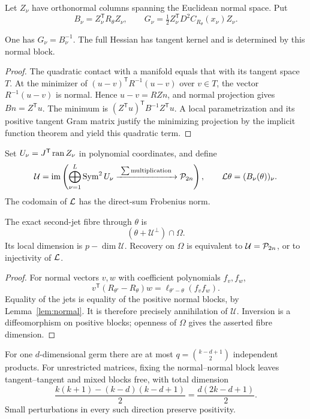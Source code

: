 Let $Z_\nu$ have orthonormal columns spanning the Euclidean normal space. Put
\[
 B_\nu=Z_\nu^{\mathsf T}R_\theta Z_\nu,\qquad
 G_\nu=\tfrac12Z_\nu^{\mathsf T}D^2C_{R_\theta}(x_\nu)Z_\nu.
\]
\begin{lemma}\label{lem:normal}
One has $G_\nu=B_\nu^{-1}$. The full Hessian has tangent kernel and is determined by this normal block.
\end{lemma}
\begin{proof}
The quadratic contact with a manifold equals that with its tangent space $T$. At the minimizer of $(u-v)^{\mathsf T}R^{-1}(u-v)$ over $v\in T$, the vector $R^{-1}(u-v)$ is normal. Hence $u-v=RZn$, and normal projection gives $Bn=Z^{\mathsf T}u$. The minimum is $(Z^{\mathsf T}u)^{\mathsf T}B^{-1}Z^{\mathsf T}u$. A local parametrization and its positive tangent Gram matrix justify the minimizing projection by the implicit function theorem and yield this quadratic term.
\end{proof}
Set $U_\nu=J^{\mathsf T}\operatorname{ran} Z_\nu$ in polynomial coordinates, and define
\[
 \mathcal U=\operatorname{im}\left(\bigoplus_{\nu=1}^L\Sym^2U_\nu
                  \xrightarrow{\ \sum\mathrm{multiplication}\ }\PP_{2n}\right),
 \qquad \LL\theta=(B_\nu(\theta))_\nu.
\]
The codomain of $\mathcal L$ has the direct-sum Frobenius norm.
\begin{theorem}\label{thm:fibre}
The exact second-jet fibre through $\theta$ is
\[
 (\theta+\mathcal U^\perp)\cap\Omega.
\]
Its local dimension is $p-\dim\mathcal U$. Recovery on $\Omega$ is equivalent to $\mathcal U=\mathcal P_{2n}$, or to injectivity of $\mathcal L$.
\end{theorem}
\begin{proof}
For normal vectors $v,w$ with coefficient polynomials $f_v,f_w$,
\[
 v^{\mathsf T}(R_{\theta'}-R_\theta)w
       =\ell_{\theta'-\theta}(f_vf_w).
\]
Equality of the jets is equality of the positive normal blocks, by Lemma~\ref{lem:normal}. It is therefore precisely annihilation of $\mathcal U$. Inversion is a diffeomorphism on positive blocks; openness of $\Omega$ gives the asserted fibre dimension.
\end{proof}
For one $d$-dimensional germ there are at most $q=\binom{k-d+1}{2}$ independent products. For unrestricted matrices, fixing the normal--normal block leaves tangent--tangent and mixed blocks free, with total dimension
\begin{equation}\label{eq:ambient}
 \frac{k(k+1)-(k-d)(k-d+1)}2=\frac{d(2k-d+1)}2.
\end{equation}
Small perturbations in every such direction preserve positivity.

